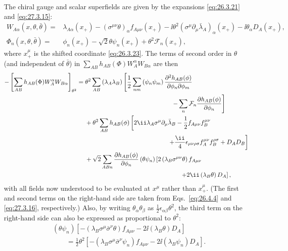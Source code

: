 The chiral gauge and scalar superfields are given by the expansions
\eqref{eq:26.3.21} and \eqref{eq:27.3.15}:
\[
  \begin{aligned}
  W_{A\alpha}(x,\theta,\bar\theta)={}&
  \lambda_{A\alpha}(x_+)
  -(\sigma^{\mu\nu}\theta)_\alpha f_{A\mu\nu}(x_+)
  -\ii\theta^2(\sigma^\mu\partial_\mu\bar\lambda_A)_\alpha(x_+)
  -\ii\theta_\alpha D_A(x_+),
  \\
  \Phi_n(x,\theta,\bar\theta)={}&
  \phi_n(x_+)
  -\sqrt{2}\theta\psi_n(x_+)
  +\theta^2\mathcal{F}_n(x_+),
  \end{aligned}
\]
where \(x_+^\mu\) is the shifted coordinate \eqref{eq:26.3.23}. The terms of
second order in \(\theta\) (and independent of \(\bar\theta\)) in
\(\sum_{AB}h_{AB}(\Phi)W_A^\alpha W_{B\alpha}\) are then
\[
  \begin{aligned}
  -\left[
    \sum_{AB}h_{AB}(\Phi)
    W_A^\alpha W_{B\alpha}
  \right]_{\theta^2}
  ={}&
  \theta^2\sum_{AB}\left(\lambda_A\lambda_B\right)
  \left[
    \frac12\sum_{nm}
      \left(\psi_n\psi_m\right)
      \frac{\partial^2h_{AB}(\phi)}
           {\partial\phi_n\partial\phi_m}
  \right.
  \\
  &\hspace{49mm}\left.
    -\sum_n\mathcal{F}_n
      \frac{\partial h_{AB}(\phi)}{\partial\phi_n}
  \right]
  \\
  &+\theta^2
  \sum_{AB}h_{AB}(\phi)
  \left[
    2\ii\lambda_A\sigma^\mu\partial_\mu\bar\lambda_B
    -\frac12f_{A\mu\nu}f_B^{\mu\nu}
  \right.
  \\
  &\hspace{47mm}\left.
    +\frac{\ii}{4}\epsilon_{\mu\nu\rho\sigma}
      f_A^{\mu\nu}f_B^{\rho\sigma}
    +D_AD_B
  \right]
  \\
  &+\sqrt{2}\sum_{ABn}
  \frac{\partial h_{AB}(\phi)}{\partial\phi_n}
  \left(\theta\psi_n\right)
  \left[
    2\left(\lambda_B\sigma^{\mu\nu}\theta\right)f_{A\mu\nu}
  \right.
  \\
  &\hspace{54mm}\left.
    +2\ii\left(\lambda_B\theta\right)D_A
  \right],
  \end{aligned}
\]
with all fields now understood to be evaluated at \(x^\mu\) rather than
\(x_+^\mu\). (The first and second terms on the right-hand side are taken
from Eqs.~\eqref{eq:26.4.4} and \eqref{eq:27.3.16}, respectively.) Also, by
writing \(\theta_\alpha\theta_\beta\) as
\(\tfrac12\epsilon_{\alpha\beta}
 \theta^2\), the third term on the right-hand
side can also be expressed as proportional to
\(\theta^2\):
\[
  \begin{aligned}
  &\left(\theta\psi_n\right)
  \left[
    -\left(\lambda_B\sigma^\mu\bar\sigma^\nu\theta\right)f_{A\mu\nu}
    -2\ii\left(\lambda_B\theta\right)D_A
  \right]
  \\
  &\qquad
  =\frac12\theta^2
  \left[
    -\left(\lambda_B\sigma^\mu\bar\sigma^\nu\psi_n\right)f_{A\mu\nu}
    -2\ii\left(\lambda_B\psi_n\right)D_A
  \right].
  \end{aligned}
\]
